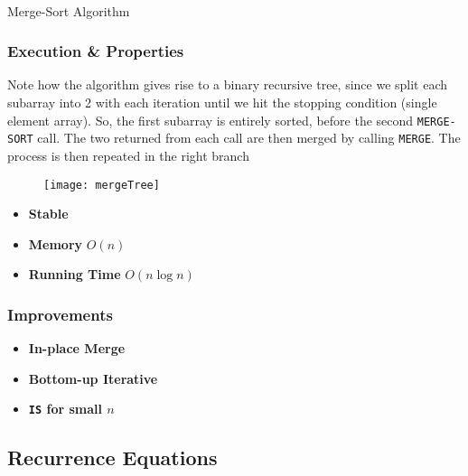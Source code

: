 	\begin{algorithm}[H]
	\DontPrintSemicolon
	\SetAlgoLined{}
	\\
	\caption{Merge-Sort Algorithm}
	\end{algorithm}

\subsubsection{Execution \& Properties}


\par{Note how the algorithm gives rise to a binary recursive tree, since we
split each subarray into 2 with each iteration until we hit the stopping
condition (single element array). So, the first subarray is entirely sorted,
before the second \texttt{MERGE-SORT} call. The two  returned
from each call are then merged by calling \texttt{MERGE}. The process is then
repeated in the right branch}

\begin{figure}[H]
	\texttt{[image: mergeTree]}
\end{figure}

\begin{itemize}
	\item\textbf{Stable}
	\item\textbf{Memory} $O(n)$
	\item\textbf{Running Time} $O(n \log n)$
\end{itemize}

\subsubsection{Improvements}

	\begin{itemize}
			\item[]\textbf{In-place Merge}
			\item[]\textbf{Bottom-up Iterative}
			\item[]\textbf{\texttt{IS} for small $n$}
	\end{itemize}
\subsection{Recurrence Equations}


